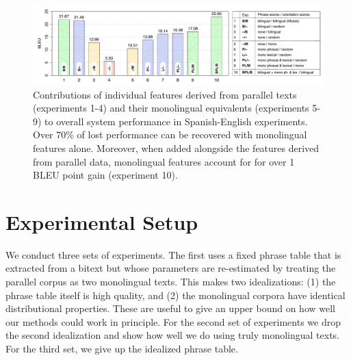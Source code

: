 \documentclass[11pt]{article}
\begin{document}

\begin{figure}[t]
\begin{center}
\includegraphics[width=\linewidth]{../figures/lesionreplacement/lesionreplacementlegend.pdf}
\caption{Contributions of individual features derived from parallel texts (experiments 1-4) and their monolingual equivalents (experiments 5-9) to overall system performance in Spanish-English experiments.  Over 70\% of lost performance can be recovered with monolingual features alone.  Moreover, when added alongside the features derived from parallel data, monolingual features account for for over 1 BLEU point gain (experiment 10).}
\label{fig:lesionreplacement}
\end{center}
\vskip -0.2in
\end{figure}

\section{Experimental Setup} \label{sect:expsetup}

We conduct three sets of experiments. The first uses a fixed phrase table that is extracted from a bitext but whose parameters are re-estimated by treating the parallel corpus as two monolingual texts. This makes two idealizations: (1) the phrase table itself is high quality, and (2) the monolingual corpora have identical distributional properties. These are useful to give an upper bound on how well our methods could work in principle. For the second set of experiments we drop the second idealization and show how well we do using truly monolingual texts. For the third set, we give up the idealized phrase table.
\end{document}

